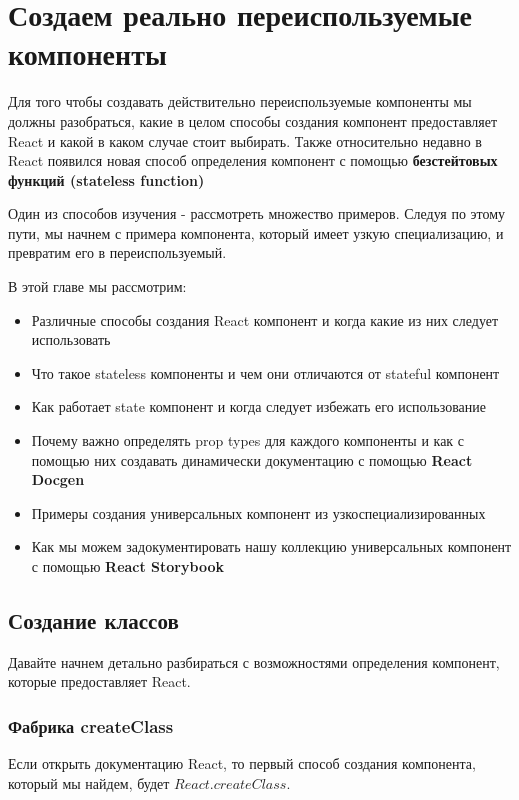 \chapter{Создаем реально переиспользуемые компоненты}

Для того чтобы создавать действительно переиспользуемые компоненты мы должны разобраться, какие в целом способы создания компонент предоставляет React и какой в каком случае стоит выбирать. Также относительно недавно в React появился новая способ определения компонент с помощью \textbf{безстейтовых функций (stateless function)}

Один из способов изучения - рассмотреть множество примеров. Следуя по этому пути, мы начнем с примера компонента, который имеет узкую специализацию, и превратим его в переиспользуемый.

В этой главе мы рассмотрим:

\begin{itemize}
  \item Различные способы создания React компонент и когда какие из них следует использовать
  \item Что такое stateless компоненты и чем они отличаются от stateful компонент
  \item Как работает state компонент и когда следует избежать его использование
  \item Почему важно определять prop types для каждого компоненты и как с помощью них создавать динамически документацию с помощью \textbf{React Docgen}
  \item Примеры создания универсальных компонент из узкоспециализированных
  \item Как мы можем задокументировать нашу коллекцию универсальных компонент с помощью \textbf{React Storybook}
\end{itemize}


\section{Создание классов}

Давайте начнем детально разбираться с возможностями определения компонент, которые предоставляет React.

\subsection*{Фабрика createClass}

Если открыть документацию React, то первый способ создания компонента, который мы найдем, будет $React.createClass$.

